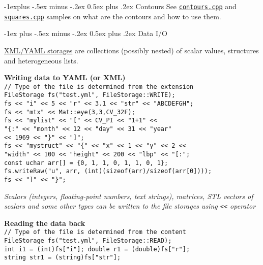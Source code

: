 \documentclass[10pt,landscape]{article}
\makeatletter
\renewcommand{\section}{\@startsection{section}{1}{0mm}%
                                {-1ex plus -.5ex minus -.2ex}%
                                {0.5ex plus .2ex}%
                                {\normalfont\large\bfseries}}
\renewcommand{\subsection}{\@startsection{subsection}{2}{0mm}%
                                {-1explus -.5ex minus -.2ex}%
                                {0.5ex plus .2ex}%
                                {\normalfont\normalsize\bfseries}}
\makeatother
\begin{document}
\begin{multicols}{3}
\subsection{Contours}
See \texttt{\href{https://code.ros.org/svn/opencv/trunk/opencv/samples/cpp/contours.cpp}{contours.cpp}} and \texttt{\href{https://code.ros.org/svn/opencv/trunk/opencv/samples/cpp/squares.cpp}{squares.cpp}}
samples on what are the contours and how to use them.

\section{Data I/O}

\href{http://opencv.willowgarage.com/documentation/cpp/core_xml_yaml_persistence.html\#filestorage}{XML/YAML storages} are collections (possibly nested) of scalar values, structures and heterogeneous lists.

\begin{tabbing}
\textbf{Wr}\=\textbf{iting data to YAML (or XML)}\\
\texttt{// Type of the file is determined from the extension}\\
\texttt{FileStorage fs("test.yml", FileStorage::WRITE);}\\
\texttt{fs << "i" << 5 << "r" << 3.1 << "str" << "ABCDEFGH";}\\
\texttt{fs << "mtx" << Mat::eye(3,3,CV\_32F);}\\
\texttt{fs << "mylist" << "[" << CV\_PI << "1+1" <<}\\
\>\texttt{"\{:" << "month" << 12 << "day" << 31 << "year"}\\
\>\texttt{<< 1969 << "\}" << "]";}\\
\texttt{fs << "mystruct" << "\{" << "x" << 1 << "y" << 2 <<}\\
\>\texttt{"width" << 100 << "height" << 200 << "lbp" << "[:";}\\
\texttt{const uchar arr[] = \{0, 1, 1, 0, 1, 1, 0, 1\};}\\
\texttt{fs.writeRaw("u", arr, (int)(sizeof(arr)/sizeof(arr[0])));}\\
\texttt{fs << "]" << "\}";}
\end{tabbing}

\emph{Scalars (integers, floating-point numbers, text strings), matrices, STL vectors of scalars and some other types can be written to the file storages using \texttt{<<} operator}

\begin{tabbing}
\textbf{Re}\=\textbf{ading the data back}\\
\texttt{// Type of the file is determined from the content}\\
\texttt{FileStorage fs("test.yml", FileStorage::READ);}\\
\texttt{int i1 = (int)fs["i"]; double r1 = (double)fs["r"];}\\
\texttt{string str1 = (string)fs["str"];}\\


\end{tabbing}
\end{multicols}
\end{document}
